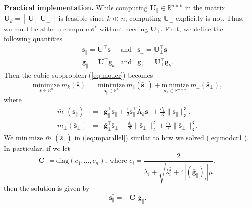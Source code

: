 \noindent \textbf{Practical implementation.} While computing 
$\mathbf{U}_{\parallel} \in \mathbb{R}^{n \times k}$
in the matrix $\mathbf{U}_{k} = [  \ \mathbf{U}_{\parallel}  \ \ \mathbf{U}_{\perp} \ ]$
is feasible since 
$k \ll n$, computing $\mathbf{U}_{\perp}$ explicitly is not.  Thus, we must be able to compute 
$\mathbf{s}^*$ without needing $\mathbf{U}_{\perp}$.  
First, we define the following quantities
$$
\begin{array}{lllllll}
\bar{\mathbf{s}}_{\parallel} 
 = \mathbf{U}_{\parallel}^{\top} \mathbf{s} 
& \text{and}  
& \bar{\mathbf{s}}_{\perp} = \mathbf{U}_{\perp}^{\top} \mathbf{s},
\\[.2cm]
\bar{\mathbf{g}}_{\parallel} = \mathbf{U}_{\parallel}^{\top} \mathbf{g}_k
& \text{and} 
& \bar{\mathbf{g}}_{\perp} = \mathbf{U}_{\perp}^{\top} \mathbf{g}_k.
\end{array}
$$
Then the cubic subproblem (\ref{eq:modcr})  becomes
\begin{equation}
\underset{\bar{\mathbf{s}}\in \mathbb{R}^n
}{\text{minimize}}  \ \bar{{m}}_{k} (\bar{\mathbf{s}})
	\ = \ 
\underset{\bar{\mathbf{s}}_{\parallel} \in \mathbb{R}^k
}{\text{minimize}}  \ \bar{{m}}_{\parallel} (\bar{\mathbf{s}}_{\parallel}) + 
\underset{\bar{\mathbf{s}}_{\perp} \in \mathbb{R}^{n-k}
}{\text{minimize}}  \ \bar{{m}}_{\perp} (\bar{\mathbf{s}}_{\perp}),
\end{equation}
where
\begin{eqnarray} \label{eq:mparallel}
	\bar{m}_{\parallel}( \bar{\mathbf{s}}_{\parallel}) \!  \ \ &=& 
	\bar{\mathbf{g}}_{\parallel}^\top\bar{\mathbf{s}}_{\parallel}
	+ \frac{1}{2}\bar{\mathbf{s}}_{\parallel}^\top \hat{\mathbf{\Lambda}}_k\bar{\mathbf{s}}_{\parallel}
	+ \frac{\mu_k}{3}\|\bar{\mathbf{s}}_{\parallel} \|_3^3,
	\\
	\label{eq:mperp}
	\bar{m}_{\perp} ( \bar{\mathbf{s}}_{\perp}) &=& 
	\bar{\mathbf{g}}_{\perp}^\top\bar{\mathbf{s}}_{\perp}
	+ \frac{\delta_k}{2} \| \bar{\mathbf{s}}_{\perp} \|_2^2
	+ \frac{\mu_k}{3}\|\bar{\mathbf{s}}_{\perp}\|_3^3.
\end{eqnarray}
We minimize $\bar{m}_{\parallel}(\bar{s}_{\parallel})$ in (\ref{eq:mparallel}) similar to how we solved (\ref{eq:modcr1}).
In particular, if we let 
\begin{equation}\label{eq:Cparallel}
	\mathbf{C}_{\parallel} = \text{diag} (c_1, \dots, c_n), \ \text{where } c_i =  \frac{2}{\lambda_i + \sqrt{\lambda_i^2 + 4| (\bar{\mathbf{g}}_{\parallel})_i|\mu}},
\end{equation}
then the solution is given by 
\begin{equation}\label{eq:sparallelstar}
	\mathbf{s}_{\parallel}^* =
	-\mathbf{C}_{\parallel} \bar{\mathbf{g}}_{\parallel}.
\end{equation}



